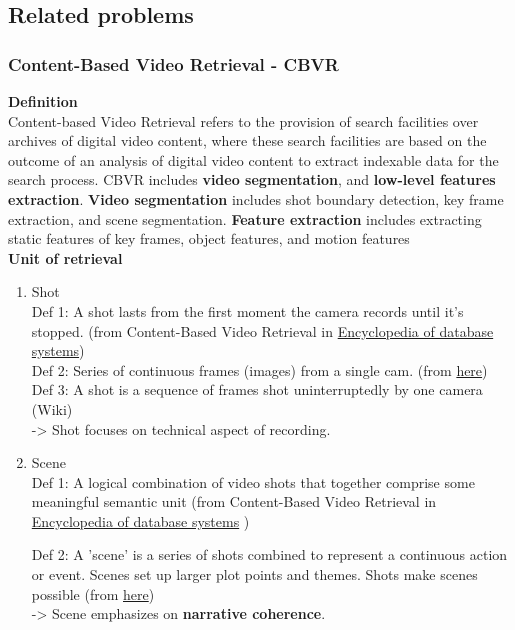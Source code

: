 \subsection{Related problems}
\subsubsection{Content-Based Video Retrieval - CBVR} %
\textbf{Definition}\\
\indent Content-based Video Retrieval refers to the provision of search facilities over archives of digital video
content, where these search facilities are based on
the outcome of an analysis of digital video content
to extract indexable data for the search process. CBVR includes \textbf{video segmentation}, and \textbf{low-level features extraction}. \textbf{Video segmentation} includes shot boundary detection, key frame extraction, and scene segmentation. \textbf{Feature extraction} includes extracting static features of key frames, object features, and motion features\\

\noindent\textbf{Unit of retrieval}\vspace{-.25cm}
\begin{enumerate}
	\item Shot\\
	Def 1: A shot lasts from the first moment the camera records until it’s stopped. (from Content-Based Video Retrieval in \href{https://link.springer.com/referencework/10.1007/978-0-387-39940-9}{Encyclopedia of database systems})\\
	
	Def 2: Series of continuous frames (images) from a single cam. (from \href{https://www.wevideo.com/blog/scene-vs-shot}{here})\\
	
	Def 3: A shot is a sequence of frames shot uninterruptedly by one camera (Wiki)\\
	-> Shot focuses on technical aspect of recording.
	
	\item Scene\\
	Def 1: A logical combination of video shots
	that together comprise some meaningful semantic
	unit (from Content-Based Video Retrieval in \href{https://link.springer.com/referencework/10.1007/978-0-387-39940-9}{Encyclopedia of database systems} )
	
	Def 2: A 'scene' is a series of shots combined to represent a continuous action or event. Scenes set up larger plot points and themes. Shots make scenes possible (from \href{https://www.wevideo.com/blog/scene-vs-shot}{here})\\
	-> Scene emphasizes on \textbf{narrative coherence}.
\end{enumerate}

